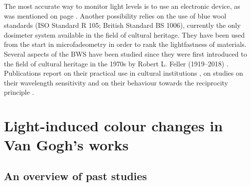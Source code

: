 The most accurate way to monitor light levels is to use an electronic device, as was mentioned on page \pageref{par: light characterisation}. Another possibility relies on the use of blue wool standards (ISO Standard R 105; British Standard BS 1006), currently the only dosimeter system available in the field of cultural heritage. They have been used from the start in microfadeometry in order to rank the lightfastness of materials. Several aspects of the \gls{BWS} have been studied since they were first introduced to the field of cultural heritage in the 1970s by Robert L. Feller (1919–2018) \citep{feller_use_1978,feller_further_1978, feller_continued_1981}. Publications report on their practical use in cultural institutions \citep{bullock_measurement_1999, tennent_light_1987}, on studies on their wavelength sensitivity \citep{hattori_wavelength_2012} and on their behaviour towards the reciprocity principle \citep{del_hoyo-melendez_investigation_2011}. \\


\newpage
\section{Light-induced colour changes in Van Gogh’s works}

\subsection{An overview of past studies}
\label{sec:overview_past_studies}

